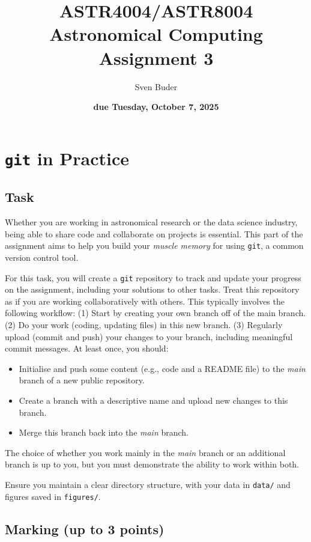 \documentclass[a4paper,12pt]{article}
\title{\Huge{ASTR4004/ASTR8004\\Astronomical Computing\\Assignment 3}}
\author{Sven Buder}
\date{\textbf{due Tuesday, October 7, 2025}}
\begin{document}
\maketitle

\section{\texttt{git} in Practice}

\subsection{Task}

Whether you are working in astronomical research or the data science industry, being able to share code and collaborate on projects is essential. This part of the assignment aims to help you build your \textit{muscle memory} for using \texttt{git}, a common version control tool.

For this task, you will create a \texttt{git} repository to track and update your progress on the assignment, including your solutions to other tasks. Treat this repository as if you are working collaboratively with others. This typically involves the following workflow: (1) Start by creating your own branch off of the main branch. (2) Do your work (coding, updating files) in this new branch. (3) Regularly upload (commit and push) your changes to your branch, including meaningful commit messages. At least once, you should:
\begin{itemize}
    \item Initialise and push some content (e.g., code and a README file) to the \textit{main} branch of a new public repository.
    \item Create a branch with a descriptive name and upload new changes to this branch.
    \item Merge this branch back into the \textit{main} branch.
\end{itemize}

The choice of whether you work mainly in the \textit{main} branch or an additional branch is up to you, but you must demonstrate the ability to work within both.

Ensure you maintain a clear directory structure, with your data in \texttt{data/} and figures saved in \texttt{figures/}.

\subsection{Marking (up to 3 points)}
\end{document}
